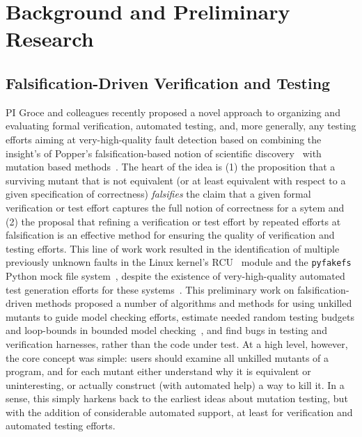 \section{Background and Preliminary Research}

\subsection{Falsification-Driven Verification and Testing}

PI Groce and colleagues recently proposed a novel approach to organizing and evaluating
formal verification, automated testing, and, more generally, any
testing efforts aiming at very-high-quality fault detection based on
combining the insight's of Popper's falsification-based notion of
scientific discovery~\cite{Popper,popperconjectures} with mutation
based methods~\cite{groce2015verified,groce2018verified,mutKernel}.
The heart of the idea is (1) the proposition that a surviving mutant that is not
equivalent (or at least equivalent with respect to a given
specification of correctness) \emph{falsifies} the claim that a given
formal verification or test effort captures the full notion of
correctness for a sytem and (2) the proposal that refining a
verification or test effort by repeated efforts at falsification is an
effective method for ensuring the quality of verification and testing
efforts.  This line of work
work resulted in the identification of multiple previously unknown faults in
the Linux kernel's
RCU~\cite{MathieuDesnoyers2012URCU,DinakarGuniguntala2008IBMSysJ,McKenney:2013:SDS:2483852.2483867}
module and the {\tt pyfakefs} Python mock file
system~\cite{pyfakefs}, despite the existence of very-high-quality
automated test generation efforts for these
systems~\cite{rcutorture,TSTL}.  This preliminary work on
falsification-driven methods proposed a number of algorithms and
methods for using unkilled mutants to guide model checking efforts,
estimate needed random testing budgets and loop-bounds in bounded model
checking~\cite{CBMCp,BMC}, and find bugs in testing and verification
harnesses, rather than the code under test.  At a high level, however,
the core concept was simple:  users should examine all unkilled
mutants of a program, and for each mutant either understand why it is
equivalent or uninteresting, or actually construct (with automated
help) a way to kill it.  In a sense, this simply harkens back to the
earliest ideas about mutation testing, but with the addition of
considerable automated support, at least for verification and
automated testing efforts.

